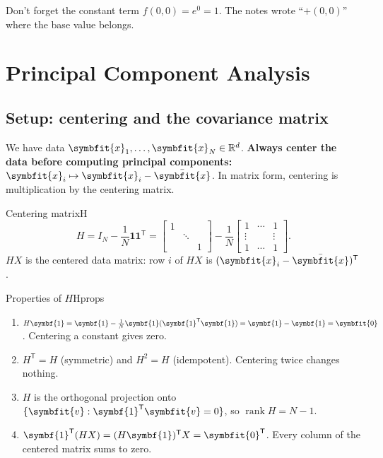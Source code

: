 \documentclass[11pt]{article}
\newcommand{\bm}[1]{\symbfit{#1}}
\newcommand{\R}{\mathbb{R}}
\newcommand{\vx}{\bm{x}}
\newcommand{\one}{\symbf{1}}
\newcommand{\xbar}{\bar{\bm{x}}}
\newcommand{\T}{^{\mathsf T}}
\newcommand{\rank}{\operatorname{rank}}
\begin{document}
\begin{careful}
Don't forget the constant term $f(0,0)=e^0=1$. The notes wrote ``$+(0,0)$'' where
the base value belongs.
\end{careful}

\section{Principal Component Analysis}\label{sec:pca}

\subsection{Setup: centering and the covariance matrix}

We have data $\vx_1,\dots,\vx_N\in\R^d$. \textbf{Always center the data before
computing principal components:} $\vx_i\mapsto\vx_i-\xbar$. In matrix form, centering
is multiplication by the centering matrix.

\begin{definition}{Centering matrix}{H}
\[
H=I_N-\frac1N\one\one\T=
\begin{bmatrix}1&&\\&\ddots&\\&&1\end{bmatrix}-\frac1N\begin{bmatrix}1&\cdots&1\\\vdots&&\vdots\\1&\cdots&1\end{bmatrix}.
\]
$HX$ is the centered data matrix: row $i$ of $HX$ is $(\vx_i-\xbar)\T$.
\end{definition}

\begin{proposition}{Properties of $H$}{Hprops}
\begin{enumerate}[nosep,label=(\roman*)]
\item $H\one=\one-\tfrac1N\one(\one\T\one)=\one-\one=\bm 0$. Centering a constant gives zero.
\item $H\T=H$ (symmetric) and $H^2=H$ (idempotent). Centering twice changes nothing.
\item $H$ is the orthogonal projection onto $\{\bm v:\one\T\bm v=0\}$, so $\rank H=N-1$.
\item $\one\T(HX)=(H\one)\T X=\bm 0\T$. Every column of the centered matrix sums to zero.
\end{enumerate}
\end{proposition}
\end{document}
